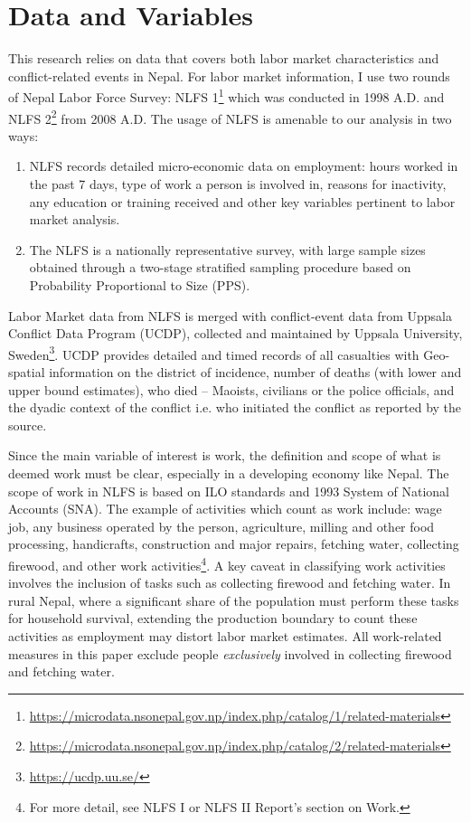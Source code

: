 \documentclass[12pt,a4paper]{article}
\begin{document}
\section{Data and Variables}
This research relies on data that covers both labor market characteristics and conflict-related events in Nepal. For labor market information, I use two rounds of Nepal Labor Force Survey: NLFS 1\footnote{\url{https://microdata.nsonepal.gov.np/index.php/catalog/1/related-materials}} which was conducted in 1998 A.D. and NLFS 2\footnote{\url{https://microdata.nsonepal.gov.np/index.php/catalog/2/related-materials}} from 2008 A.D. The usage of NLFS is amenable to our analysis in two ways: 

\begin{enumerate}
	\item NLFS records detailed micro-economic data on employment: hours worked in the past 7 days, type of work a person is involved in, reasons for inactivity, any education or training received and other key variables pertinent to labor market analysis.
	
	\item The NLFS is a nationally representative survey, with large sample sizes obtained through a two-stage stratified sampling procedure based on Probability Proportional to Size (PPS). 
\end{enumerate}

Labor Market data from NLFS is merged with conflict-event data from Uppsala Conflict Data Program (UCDP), collected and maintained by Uppsala University, Sweden\footnote{\url{https://ucdp.uu.se/}}. UCDP provides detailed and timed records of all casualties with Geo-spatial information on the district of incidence, number of deaths (with lower and upper bound estimates), who died – Maoists, civilians or the police officials, and the dyadic context of the conflict i.e. who initiated the conflict as reported by the source.

Since the main variable of interest is work, the definition and scope of what is deemed work must be clear, especially in a developing economy like Nepal. The scope of work in NLFS is based on ILO standards and 1993 System of National Accounts (SNA). The example of activities which count as work include: wage job, any business operated by the person, agriculture, milling and other food processing, handicrafts, construction and major repairs, fetching water, collecting firewood, and other work activities\footnote{For more detail, see NLFS I or NLFS II Report's section on Work.}. A key caveat in classifying work activities involves the inclusion of tasks such as collecting firewood and fetching water. In rural Nepal, where a significant share of the population must perform these tasks for household survival, extending the production boundary to count these activities as employment may distort labor market estimates. All work-related measures in this paper exclude people \textit{exclusively} involved in collecting firewood and fetching water.
\end{document}
